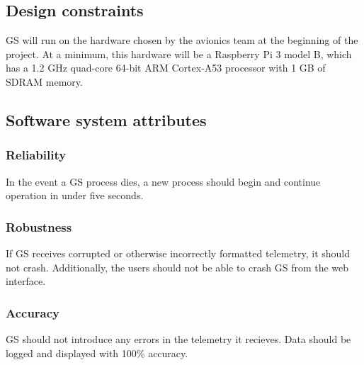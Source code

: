 \documentclass[10pt,draftclsnofoot,onecolumn]{IEEEtran}
\begin{document}
	\subsection{Design constraints}
	GS will run on the hardware chosen by the avionics team at the beginning of the project.
	At a minimum, this hardware will be a Raspberry Pi 3 model B, which has a 1.2 GHz quad-core 64-bit ARM Cortex-A53 processor
	with 1 GB of SDRAM memory.

	\subsection{Software system attributes}

	\subsubsection{Reliability}
	In the event a GS process dies, a new process should begin and continue operation in under five seconds.

	\subsubsection{Robustness}
	If GS receives corrupted or otherwise incorrectly formatted telemetry, it should not crash.
	Additionally, the users should not be able to crash GS from the web interface.

	\subsubsection{Accuracy}
	GS should not introduce any errors in the telemetry it recieves.
	Data should be logged and displayed with 100\% accuracy.

\printindex
\end{document}

